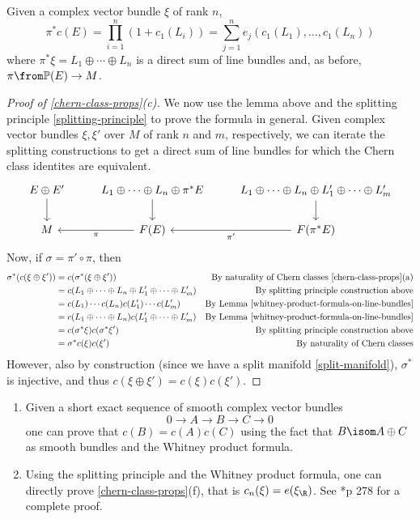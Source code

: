\documentclass[11pt,leqno,oneside]{amsbook}
\renewcommand{\P}{\mathbb{P}}
\numberwithin{thm}{section}
\begin{document}
\begin{cor}\label{chern-classes-are-elementary-symmetric-functions}
  Given a complex vector bundle \(\xi\) of rank \(n\), \[
    \pi^* c(E) = \prod_{i=1}^n (1+c_1(L_i)) = \sum_{j=1}^n
    e_j(c_1(L_1), \ldots, c_1(L_n))
  \]
  where \(\pi^* \xi = L_1 \oplus \cdots \oplus L_n\) is a direct sum
  of line bundles and, as before, \(\pi \from \P(E) \to M\).
\end{cor}
\begin{proof}[Proof of \ref{chern-class-props}(c)]
  We now use the lemma above and the splitting principle
  \ref{splitting-principle} to prove the
  formula in general. Given complex vector bundles \(\xi, \xi'\) over
  \(M\) of rank \(n\) and \(m\), respectively,
  we can iterate the splitting constructions to get a direct sum of
  line bundles for which the Chern class identites are equivalent. \[
    \begin{tikzcd}
      E \oplus E' \ar[d] & L_1 \oplus \cdots \oplus L_n \oplus \pi^* E
      \ar[d] & L_1
      \oplus \cdots \oplus L_n \oplus L_1' \oplus \cdots \oplus L_m' \ar[d]
      \\
      M & \ar[l, "\pi"] F(E) & \ar[l,"\pi'"] F(\pi^*E)
    \end{tikzcd}
  \]
  Now, if \(\sigma = \pi' \circ \pi\), then
  \begin{align*}
    \sigma^*(c(\xi \oplus \xi'))
    & = c(\sigma^*(\xi \oplus \xi'))
    & \text{By naturality of Chern classes \ref{chern-class-props}(a)}\\
    & = c(L_1 \oplus \cdots \oplus L_n \oplus L_1' \oplus \cdots
      \oplus L_m')
    & \text{By splitting principle construction above}\\
    & = c(L_1) \cdots c(L_n) c(L_1') \cdots c(L_m')
    & \text{By Lemma \ref{whitney-product-formula-on-line-bundles}} \\
    & = c(L_1 \oplus \cdots \oplus L_n) c(L_1' \oplus \cdots \oplus
      L_m')
    & \text{By Lemma \ref{whitney-product-formula-on-line-bundles}}\\
    & = c(\sigma^* \xi) c(\sigma^* \xi') 
    & \text{By splitting principle construction above} \\
    & = \sigma^* c(\xi)c(\xi')
    & \text{By naturality of Chern classes}
  \end{align*}
  However, also by construction (since we have a split manifold
  \ref{split-manifold}), \(\sigma^*\) is injective, and thus \(c(\xi
  \oplus \xi') = c(\xi)c(\xi')\).
\end{proof}
\begin{rmk}
  \begin{enumerate}
  \item Given a short exact sequence of smooth complex vector
    bundles \[
      0 \to A \to B \to C \to 0
    \]
    one can prove that \(c(B) = c(A)c(C)\) using the fact that \(B \isom A
    \oplus C\) as smooth bundles and the Whitney product formula.
  \item Using the splitting principle and the Whitney product formula,
    one can directly prove \ref{chern-class-props}(f), that is
    \(c_n(\xi) = e(\xi_\R)\). See \cite{bott-tu}*{p 278} for a
    complete proof.
  \end{enumerate}
\end{rmk}
\end{document}
